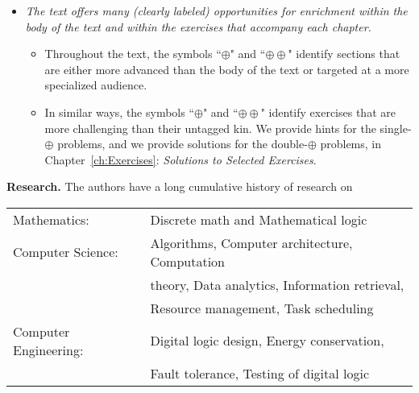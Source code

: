 \begin{itemize}
\begin{itemize}
  \item
Citations tagged ``{\bf [T]}" point to advanced and/or specialized textbooks.  They will lead the interested reader beyond the introductory level of this text.  For instance, our description in Appendix E of ``carry-free" addition can be a stepping stone to a study of the details of computer arithmetic.

  \item
Untagged citations identify ``modern" expositions of the material we describe in the text.  They also usually will lead the interested reader beyond the introductory level of this text.  Indeed, they are often quite technical companions to quite dramatic human interest stories.
  \end{itemize}

\item
{\em The text offers many (clearly labeled) opportunities for enrichment within the body of the text and within the exercises that accompany each chapter.}

  \begin{itemize}
  \item
Throughout the text, the symbols ``$\oplus$" and ``$\oplus \oplus$" identify sections that are either more advanced than the body of the text or targeted at a more specialized audience.
  \item
In similar ways, the symbols ``$\oplus$" and ``$\oplus \oplus$" identify exercises that are more challenging than their untagged kin.  We provide hints for the single-$\oplus$ problems, and we provide solutions for the double-$\oplus$ problems, in Chapter~\ref{ch:Exercises}: {\it Solutions to Selected Exercises}.
  \end{itemize}
\end{itemize}

\bigskip


\medskip

\noindent
{\bf Research.}
The authors have a long cumulative history of research on

\noindent \begin{tabular}{ll}
{\sc Mathematics:} &
Discrete math and Mathematical logic \\
{\sc Computer Science:} &
Algorithms, Computer architecture, Computation \\ 
   & theory, Data analytics, Information retrieval, \\
   & Resource management, Task scheduling \\
{\sc Computer Engineering:} &
Digital logic design, Energy conservation, \\
  & Fault tolerance, Testing of digital logic
\end{tabular}

